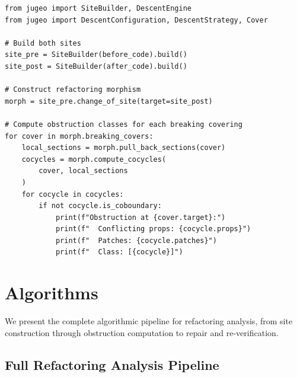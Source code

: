 \documentclass[11pt]{article}
\begin{document}
\begin{lstlisting}[style=jugeo-python]
from jugeo import SiteBuilder, DescentEngine
from jugeo import DescentConfiguration, DescentStrategy, Cover

# Build both sites
site_pre = SiteBuilder(before_code).build()
site_post = SiteBuilder(after_code).build()

# Construct refactoring morphism
morph = site_pre.change_of_site(target=site_post)

# Compute obstruction classes for each breaking covering
for cover in morph.breaking_covers:
    local_sections = morph.pull_back_sections(cover)
    cocycles = morph.compute_cocycles(
        cover, local_sections
    )
    for cocycle in cocycles:
        if not cocycle.is_coboundary:
            print(f"Obstruction at {cover.target}:")
            print(f"  Conflicting props: {cocycle.props}")
            print(f"  Patches: {cocycle.patches}")
            print(f"  Class: [{cocycle}]")
\end{lstlisting}

\section{Algorithms}\label{sec:algorithm}

We present the complete algorithmic pipeline for refactoring analysis,
from site construction through obstruction computation to repair and
re-verification.

\subsection{Full Refactoring Analysis Pipeline}\label{ssec:full-pipeline}
\end{document}

